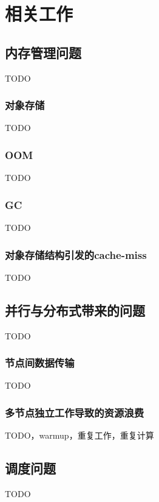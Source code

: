 
\chapter{相关工作}

\section{内存管理问题}

TODO
\subsection{对象存储}
TODO

\subsection{OOM}
TODO

\subsection{GC}
TODO

\subsection{对象存储结构引发的cache-miss}
TODO


\section{并行与分布式带来的问题}
TODO

\subsection{节点间数据传输}
TODO

\subsection{多节点独立工作导致的资源浪费}
TODO，warmup，重复工作，重复计算

\section{调度问题}
TODO



